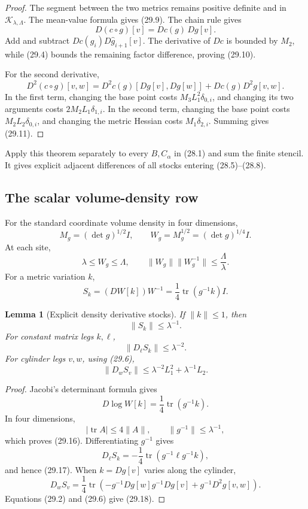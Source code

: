 \documentclass[11pt]{article}
\newtheorem{lemma}[theorem]{Lemma}
\begin{document}
\begin{proof}
The segment between the two metrics remains positive definite and in
\(\mathcal K_{\lambda,\Lambda}\).  The mean-value formula gives
(29.9).  The chain rule gives
\[
 D(c\circ g)[v]=Dc(g)\,Dg[v].
\]
Add and subtract
\(Dc(g_i)D\widehat g_{i+1}[v]\).  The derivative of \(Dc\) is bounded by
\(M_2\), while (29.4) bounds the remaining factor difference, proving
(29.10).

For the second derivative,
\[
 D^2(c\circ g)[v,w]
 =
 D^2c(g)[Dg[v],Dg[w]]
 +Dc(g)D^2g[v,w].
 \tag{29.12}
\]
In the first term, changing the base point costs
\(M_3L_1^2\delta_{0,i}\), and changing its two arguments costs
\(2M_2L_1\delta_{1,i}\).  In the second term, changing the base point
costs \(M_2L_2\delta_{0,i}\), and changing the metric Hessian costs
\(M_1\delta_{2,i}\).  Summing gives (29.11).
\end{proof}

Apply this theorem separately to every \(B,C_\alpha\) in (28.1) and sum
the finite stencil.  It gives explicit adjacent differences of all
stocks entering (28.5)--(28.8).

\subsection{The scalar volume-density row}

For the standard coordinate volume density in four dimensions,
\[
 M_g=(\det g)^{1/2}I,\qquad
 W_g=M_g^{1/2}=(\det g)^{1/4}I.
 \tag{29.13}
\]
At each site,
\[
 \lambda\leq W_g\leq\Lambda,
 \qquad
 \|W_g\|\|W_g^{-1}\|\leq\frac{\Lambda}{\lambda}.
 \tag{29.14}
\]
For a metric variation \(k\),
\[
 S_k=(D W[k])W^{-1}
 =\frac14\operatorname{tr}(g^{-1}k)I.
 \tag{29.15}
\]

\begin{lemma}[Explicit density derivative stocks]
\label{lem:v11v29-density-stocks}
If \(\|k\|\leq1\), then
\[
 \|S_k\|\leq\lambda^{-1}.
 \tag{29.16}
\]
For constant matrix legs \(k,\ell\),
\[
 \|D_\ell S_k\|\leq\lambda^{-2}.
 \tag{29.17}
\]
For cylinder legs \(v,w\), using (29.6),
\[
 \|D_wS_v\|
 \leq
 \lambda^{-2}L_1^2+\lambda^{-1}L_2.
 \tag{29.18}
\]
\end{lemma}

\begin{proof}
Jacobi's determinant formula gives
\[
 D\log W[k]=\frac14\operatorname{tr}(g^{-1}k).
\]
In four dimensions,
\[
 |\operatorname{tr}A|\leq4\|A\|,
 \qquad \|g^{-1}\|\leq\lambda^{-1},
\]
which proves (29.16).  Differentiating \(g^{-1}\) gives
\[
 D_\ell S_k
 =
 -\frac14\operatorname{tr}(g^{-1}\ell g^{-1}k),
\]
and hence (29.17).  When \(k=Dg[v]\) varies along the cylinder,
\[
 D_wS_v
 =
 \frac14\operatorname{tr}
 \left(
 -g^{-1}Dg[w]g^{-1}Dg[v]
 +g^{-1}D^2g[v,w]
 \right).
\]
Equations (29.2) and (29.6) give (29.18).
\end{proof}
\end{document}
